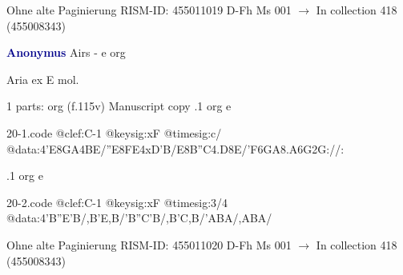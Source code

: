 \documentclass[twocolumn]{book}
\begin{document}
\newline Ohne alte Paginierung
\newline RISM-ID: 455011019
\newline D-Fh  Ms 001
\newline $\rightarrow$ In collection 418 (455008343)
      
\newline \par \vspace{7pt} \textcolor{darkblue}{\textbf{Anonymus  }}
\newline Airs - e
\newline org
\newline \begin{itshape}[f.115v, heading:] Aria ex E mol.\end{itshape} 
\newline \textcolor{darkblue}{}  1 parts: org  (f.115v)
\newline Manuscript copy
.1  org  e  
\begin{filecontents*}{20-1.code}
@clef:C-1
@keysig:xF
@timesig:c/
@data:4'E{8GA}4BE/''E{8FE}4xD'B/E{8B''C}4.D8E/{'F6GA}{8.A6G}2G://:
\end{filecontents*}
\newline
%

.1  org  e  
\begin{filecontents*}{20-2.code}
@clef:C-1
@keysig:xF
@timesig:3/4
@data:4'B''E'B/,B'E,B/'B''C'B/,B'C,B/'ABA/,ABA/
\end{filecontents*}
\newline
%

\newline Ohne alte Paginierung
\newline RISM-ID: 455011020
\newline D-Fh  Ms 001
\newline $\rightarrow$ In collection 418 (455008343)
      
\end{document}
